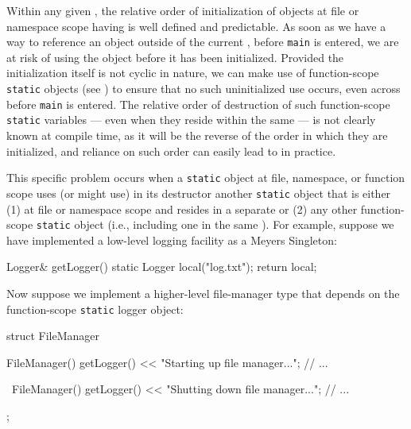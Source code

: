Within any given , the relative order of initialization
of objects at file or namespace scope having  is
well defined and predictable. As soon as we have a way to reference an
object outside of the current , before \lstinline!main! is
entered, we are at risk of using the object before it has been
initialized. Provided the initialization itself is not cyclic in nature,
we can make use of function-scope \lstinline!static! objects (see ) to
ensure that no such uninitialized use occurs, even across 
before \lstinline!main! is entered. The relative order of destruction
of such function-scope \lstinline!static! variables --- even when they
reside within the same  --- is not clearly known at compile time,
as it will be the reverse of the order in which they are initialized, and
reliance on such order can easily lead to  in
practice.

This specific problem occurs when a \lstinline!static! object at file,
namespace, or function scope uses (or might use) in its destructor
another \lstinline!static! object that is either (1) at file or namespace
scope and resides in a separate  or (2) any other
function-scope \lstinline!static! object (i.e., including one in the same
). For example, suppose we have implemented a low-level
logging facility as a Meyers Singleton:

\newpage%
\begin{emcppslisting}[emcppsbatch=e15]
Logger& getLogger()
{
    static Logger local("log.txt");
    return local;
}
\end{emcppslisting}

\noindent Now suppose we implement a higher-level file-manager type that depends
on the function-scope \lstinline!static! logger object:

\begin{emcppslisting}[emcppsbatch=e15]
struct FileManager
{
    FileManager()
    {
         getLogger() << "Starting up file manager...";
         // ...
    }

    ~FileManager()
    {
        getLogger() << "Shutting down file manager...";
        // ...
    }
};
\end{emcppslisting}

